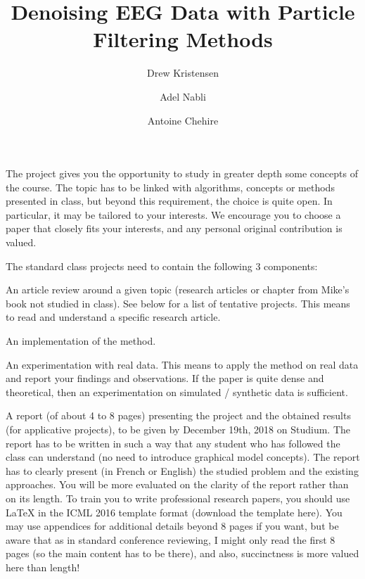 \documentclass[12pt]{article}
\title{Denoising EEG Data with Particle Filtering Methods}
\author{Drew Kristensen\and Adel Nabli\and Antoine Chehire}
\begin{document}
\maketitle  


The project gives you the opportunity to study in greater depth some concepts of the course. The topic has to be linked with algorithms, concepts or methods presented in class, but beyond this requirement, the choice is quite open. In particular, it may be tailored to your interests. We encourage you to choose a paper that closely fits your interests, and any personal original contribution is valued.

The standard class projects need to contain the following 3 components:

An article review around a given topic (research articles or chapter from Mike's book not studied in class). See below for a list of tentative projects. This means to read and understand a specific research article.

An implementation of the method.

An experimentation with real data. This means to apply the method on real data and report your findings and observations. If the paper is quite dense and theoretical, then an experimentation on simulated / synthetic data is sufficient.

A report (of about 4 to 8 pages) presenting the project and the obtained results (for applicative projects), to be given by December 19th, 2018 on Studium. The report has to be written in such a way that any student who has followed the class can understand (no need to introduce graphical model concepts). The report has to clearly present (in French or English) the studied problem and the existing approaches. You will be more evaluated on the clarity of the report rather than on its length. To train you to write professional research papers, you should use LaTeX in the ICML 2016 template format (download the template here). You may use appendices for additional details beyond 8 pages if you want, but be aware that as in standard conference reviewing, I might only read the first 8 pages (so the main content has to be there), and also, succinctness is more valued here than length!



\end{document}
